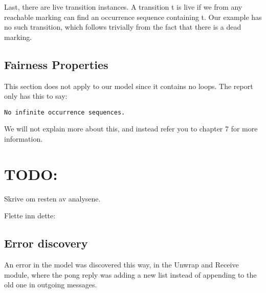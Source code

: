 	Last, there are live transition instances. A transition t is
	live if we from any reachable marking can find an occurrence sequence containing t.
	Our example has no such transition, which follows trivially from the fact that
	there is a dead marking.

	\subsection{Fairness Properties}
	This section does not apply to our model since it contains no loops. The report
	only has this to say:
	\begin{lstlisting}[language={}]
	No infinite occurrence sequences.
	\end{lstlisting}
	We will not explain more about this, and instead refer you to \cite{cpn_book}
	chapter 7 for more information.
	
\section{TODO:} 
Skrive om resten av analysene.

Flette inn dette:

\subsection{Error discovery}
An error in the model was discovered this way, in the Unwrap and Receive module,
where the pong reply was adding a new list instead of appending to the old one
in outgoing messages.
